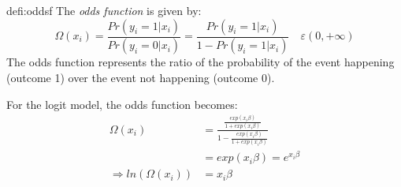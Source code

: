 			\begin{defi}{defi:oddsf}
				The \emph{odds function} is given by:
				\begin{equation*}
					\Omega(x_i)=\frac{Pr(y_i=1|x_i)}{Pr(y_i=0|x_i)}=\frac{Pr(y_i=1|x_i)}{1-Pr(y_i=1|x_i)}\quad \varepsilon(0,+\infty)
				\end{equation*}
				The odds function represents the ratio of the probability of the event happening (outcome 1) over the event not happening (outcome 0).
			\end{defi}
			For the logit model, the odds function becomes:
			\begin{align*}
				\Omega(x_i)&=\frac{\frac{exp(x_i \beta)}{1+exp(x_i \beta)}}{1-\frac{exp(x_i \beta)}{1+exp(x_i \beta)}}\\
				&=exp(x_i \beta)=e^{x_i \beta}\\
				\Rightarrow ln\left(\Omega(x_i)\right)&=x_i \beta		
			\end{align*}
